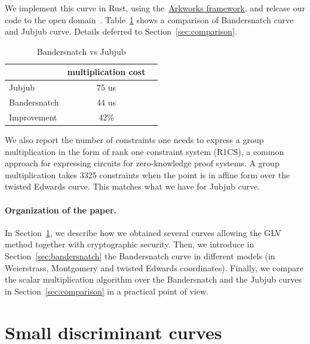 \documentclass{article}
\theoremstyle{definition}
\begin{document}
We implement this curve in Rust, using
the~\href{http://arkworks.rs}{Arkworks framework}, and release our
code to the open domain~\cite{bandersnatch-rust}.
Table~\ref{tab:comp} shows a comparison of Bandersnatch curve
and Jubjub curve. 
Details deferred to Section~\ref{sec:comparison}.

\begin{table}[ht] %
  \centering
  
  \begin{tabular}{|l|c|c|}\hline
      & multiplication cost  \\\hline\hline
    Jubjub & 75 us   \\\hline
    Bandersnatch & 44 us   \\\hline\hline   
    Improvement & 42\% \\\hline
  \end{tabular}
  \caption{Bandersnatch vs Jubjub}
  \label{tab:comp}
\end{table}

We also report the number of 
constraints one needs to express a group multiplication
in the form of rank one constraint system (R1CS), 
a common approach for expressing circuits for zero-knowledge 
proof systems. 
A group multiplication takes 
3325
constraints when the point is in affine form over the 
twisted Edwards curve.
This matches what we have for Jubjub curve.

\paragraph{Organization of the paper.}
In Section~\ref{sec:small-disc-curves}, we describe how we obtained
several curves allowing the GLV method together with cryptographic
security.
Then, we introduce in Section~\ref{sec:bandersnatch} the Bandersnatch
curve in different models (in Weierstrass, Montgomery and twisted Edwards
coordinates).
Finally, we compare the scalar multiplication algorithm over
the Bandersnatch and the Jubjub curves in
Section~\ref{sec:comparison} in a practical point of view.


\section{Small discriminant curves}\label{sec:small-disc-curves}
\end{document}
